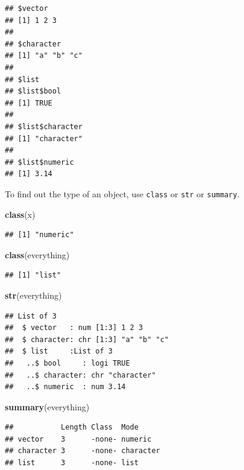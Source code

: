 \documentclass[openany]{book}
\newenvironment{Shaded}{\begin{snugshade}}{\end{snugshade}}
\newcommand{\KeywordTok}[1]{\textcolor[rgb]{0.13,0.29,0.53}{\textbf{#1}}}
\newcommand{\NormalTok}[1]{#1}
\begin{document}
\begin{verbatim}
## $vector
## [1] 1 2 3
## 
## $character
## [1] "a" "b" "c"
## 
## $list
## $list$bool
## [1] TRUE
## 
## $list$character
## [1] "character"
## 
## $list$numeric
## [1] 3.14
\end{verbatim}

To find out the type of an object, use \texttt{class} or \texttt{str} or \texttt{summary}.

\begin{Shaded}
\begin{Highlighting}[]
\KeywordTok{class}\NormalTok{(x)}
\end{Highlighting}
\end{Shaded}

\begin{verbatim}
## [1] "numeric"
\end{verbatim}

\begin{Shaded}
\begin{Highlighting}[]
\KeywordTok{class}\NormalTok{(everything)}
\end{Highlighting}
\end{Shaded}

\begin{verbatim}
## [1] "list"
\end{verbatim}

\begin{Shaded}
\begin{Highlighting}[]
\KeywordTok{str}\NormalTok{(everything)}
\end{Highlighting}
\end{Shaded}

\begin{verbatim}
## List of 3
##  $ vector   : num [1:3] 1 2 3
##  $ character: chr [1:3] "a" "b" "c"
##  $ list     :List of 3
##   ..$ bool     : logi TRUE
##   ..$ character: chr "character"
##   ..$ numeric  : num 3.14
\end{verbatim}

\begin{Shaded}
\begin{Highlighting}[]
\KeywordTok{summary}\NormalTok{(everything)}
\end{Highlighting}
\end{Shaded}

\begin{verbatim}
##           Length Class  Mode     
## vector    3      -none- numeric  
## character 3      -none- character
## list      3      -none- list
\end{verbatim}
\end{document}

